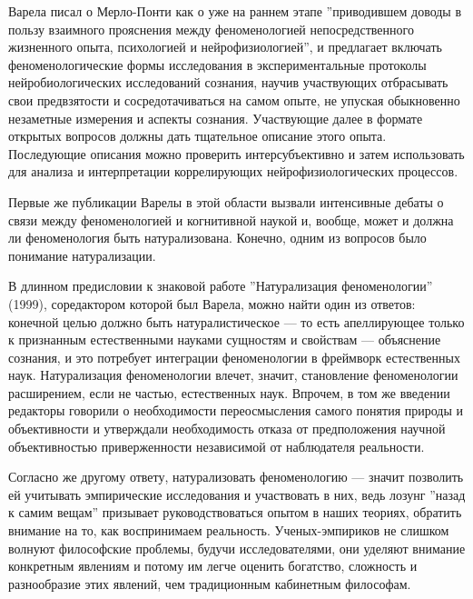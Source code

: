 \documentclass[11pt]{book}
\begin{document}
Варела писал о Мерло-Понти как о уже на раннем этапе ''приводившем доводы в пользу взаимного прояснения между феноменологией непосредственного жизненного опыта, психологией и нейрофизиологией'', и предлагает включать феноменологические формы исследования в экспериментальные протоколы нейробиологических исследований сознания, научив участвующих отбрасывать свои предвзятости и сосредотачиваться на самом опыте, не упуская обыкновенно незаметные измерения и аспекты сознания. Участвующие далее в формате открытых вопросов должны дать тщательное описание этого опыта. Последующие описания можно проверить интерсубъективно и затем использовать для анализа и интерпретации коррелирующих нейрофизиологических процессов.

Первые же публикации Варелы в этой области вызвали интенсивные дебаты о связи между феноменологией и когнитивной наукой и, вообще, может и должна ли феноменология быть натурализована. Конечно, одним из вопросов было понимание натурализации.

В длинном предисловии к знаковой работе ''Натурализация феноменологии'' (1999), соредактором которой был Варела, можно найти один из ответов: конечной целью должно быть натуралистическое --- то есть апеллирующее только к признанным естественными науками сущностям и свойствам --- объяснение сознания, и это потребует интеграции феноменологии в фреймворк естественных наук. Натурализация феноменологии влечет, значит, становление феноменологии расширением, если не частью, естественных наук. Впрочем, в том же введении редакторы говорили о необходимости переосмысления самого понятия природы и объективности и утверждали необходимость отказа от предположения научной объективностью приверженности независимой от наблюдателя реальности.

Согласно же другому ответу, натурализовать феноменологию --- значит позволить ей учитывать эмпирические исследования и участвовать в них, ведь лозунг ''назад к самим вещам'' призывает руководствоваться опытом в наших теориях, обратить внимание на то, как воспринимаем реальность. Ученых-эмпириков не слишком волнуют философские проблемы, будучи исследователями, они уделяют внимание конкретным явлениям и потому им легче оценить богатство, сложность и разнообразие этих явлений, чем традиционным кабинетным философам.
\end{document}
